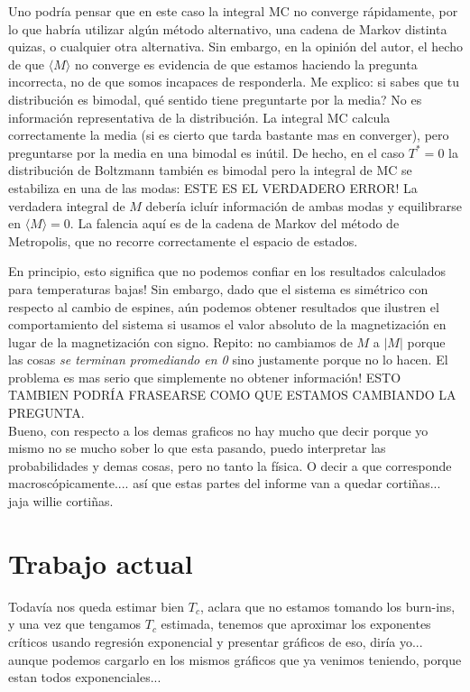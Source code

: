 \documentclass[a4paper,12pt]{article}
\begin{document}
Uno podría pensar que en este caso la integral MC no converge rápidamente, por lo que habría utilizar algún método alternativo, una cadena de Markov distinta quizas, o cualquier otra alternativa. Sin embargo, en la opinión del autor, el hecho de que $\langle M \rangle$ no converge es evidencia de que estamos haciendo la pregunta incorrecta, no de que somos incapaces de responderla. Me explico: si sabes que tu distribución es bimodal, qué sentido tiene preguntarte por la media? No es información representativa de la distribución. La integral MC calcula correctamente la media (si es cierto que tarda bastante mas en converger), pero preguntarse por la media en una bimodal es inútil. De hecho, en el caso $T^* = 0$ la distribución de Boltzmann también es bimodal pero la integral de MC se estabiliza en una de las modas: ESTE ES EL VERDADERO ERROR! La verdadera integral de $M$ debería icluír información de ambas modas y equilibrarse en $\langle M \rangle = 0$. La falencia aquí es de la cadena de Markov del método de Metropolis, que no recorre correctamente el espacio de estados.

En principio, esto significa que no podemos confiar en los resultados calculados para temperaturas bajas! Sin embargo, dado que el sistema es simétrico con respecto al cambio de espines, aún podemos obtener resultados que ilustren el comportamiento del sistema si usamos el valor absoluto de la magnetización en lugar de la magnetización con signo. Repito: no cambiamos de $M$ a $|M|$ porque las cosas {\it se terminan promediando en 0} sino justamente porque no lo hacen. El problema es mas serio que simplemente no obtener información! ESTO TAMBIEN PODRÍA FRASEARSE COMO QUE ESTAMOS CAMBIANDO LA PREGUNTA.\\

Bueno, con respecto a los demas graficos no hay mucho que decir porque yo mismo no se mucho sober lo que esta pasando, puedo interpretar las probabilidades y demas cosas, pero no tanto la física. O decir a que corresponde macroscópicamente.... así que estas partes del informe van a quedar cortiñas... jaja willie cortiñas.

\section{Trabajo actual}

Todavía nos queda estimar bien $T_c$, aclara que no estamos tomando los burn-ins, y una vez que tengamos $T_c$ estimada, tenemos que aproximar los exponentes críticos usando regresión exponencial y presentar gráficos de eso, diría yo... aunque podemos cargarlo en los mismos gráficos que ya venimos teniendo, porque estan todos exponenciales...
\end{document}

